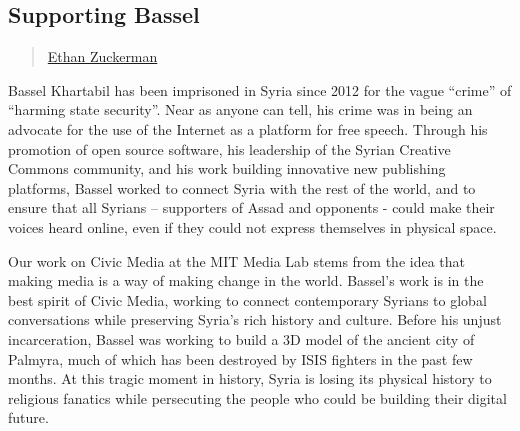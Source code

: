 \subsection{Supporting Bassel}\label{supporting-bassel}

\begin{quote}
\hyperlink{ethan-zuckerman}{Ethan Zuckerman}
\end{quote}

Bassel Khartabil has been imprisoned in Syria since 2012 for the vague
``crime'' of ``harming state security''. Near as anyone can tell, his
crime was in being an advocate for the use of the Internet as a platform
for free speech. Through his promotion of open source software, his
leadership of the Syrian Creative Commons community, and his work
building innovative new publishing platforms, Bassel worked to connect
Syria with the rest of the world, and to ensure that all Syrians --
supporters of Assad and opponents - could make their voices heard
online, even if they could not express themselves in physical space.

Our work on Civic Media at the MIT Media Lab stems from the idea that
making media is a way of making change in the world. Bassel's work is in
the best spirit of Civic Media, working to connect contemporary Syrians
to global conversations while preserving Syria's rich history and
culture. Before his unjust incarceration, Bassel was working to build a
3D model of the ancient city of Palmyra, much of which has been
destroyed by ISIS fighters in the past few months. At this tragic moment
in history, Syria is losing its physical history to religious fanatics
while persecuting the people who could be building their digital future.

